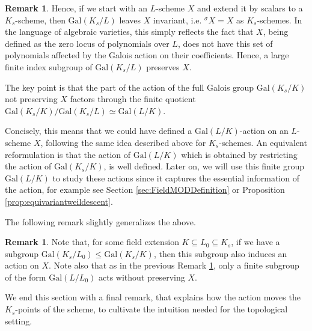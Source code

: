 \documentclass[10pt]{amsart}
\theoremstyle{definition}
\newtheorem{remark}[theorem]{Remark}
\newcommand{\Gal}{{ \mathrm{Gal}}}
\begin{document}
\begin{remark}\label{rem:invariantactionofsubgroup}
Hence, if we start with an $L$-scheme $X$ and extend it by scalars to a $K_s$-scheme, then $\Gal(K_s/L)$ leaves $X$ invariant, i.e. $^\sigma \! X = X$ as $K_s$-schemes. In the language of algebraic varieties, this simply reflects the fact that $X$, being defined as the zero locus of polynomials over $L$, does not have this set of polynomials affected by the Galois action on their coefficients. Hence, a large finite index subgroup of $\Gal(K_s/L)$ preserves $X$.


The key point is that the part of the action of the full Galois group $\Gal(K_s/K)$ not preserving $X$ factors through the finite quotient $\Gal(K_s /K) / \Gal(K_s/L) \simeq \Gal(L/K)$.

Concisely, this means that we could have defined a $\Gal(L/K)$-action on an $L$-scheme $X$, following the same idea described above for $K_s$-schemes. An equivalent reformulation is that the action of $\Gal(L/K)$ which is obtained by restricting the action of $\Gal(K_s/K)$, is well defined.
Later on, we will use this finite group $\Gal(L/K)$ to study these actions since it captures the essential information of the action, for example see Section \ref{sec:FieldMODDefinition} or Proposition \ref{prop:equivariantweildescent}.
\end{remark}

The following remark slightly generalizes the above.
\begin{remark}\label{rem:generalizedgroupaction}
    Note that, for some field extension $K \subseteq L_0 \subseteq K_s$, if we have a subgroup $\Gal (K_s / L_0) \leq \Gal (K_s/K)$, then this subgroup also induces an action on $X$.
    Note also that as in the previous Remark \ref{rem:invariantactionofsubgroup}, only a finite subgroup of the form $\Gal(L / L_0) $ acts without preserving $X$.
\end{remark}

We end this section with a final remark, that explains how the action moves the $K_s$-points of the scheme, to cultivate the intuition needed for the topological setting. 
\end{document}
